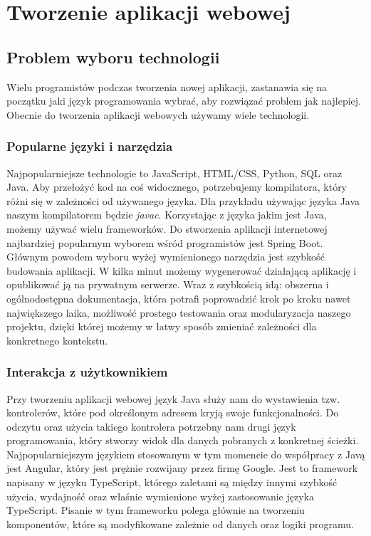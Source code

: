 \chapter{Tworzenie aplikacji webowej}

\section{Problem wyboru technologii}

Wielu programistów podczas tworzenia nowej aplikacji, zastanawia się na początku jaki język programowania wybrać, aby rozwiązać problem jak najlepiej. Obecnie do tworzenia aplikacji webowych używamy wiele technologii.

\subsection{Popularne języki i narzędzia}

Najpopularniejsze technologie to JavaScript, HTML/CSS, Python, SQL oraz Java. Aby przełożyć kod na coś widocznego, potrzebujemy kompilatora, który różni się w zależności od używanego języka. Dla przykładu używając języka Java naszym kompilatorem będzie \textit{javac}. Korzystając z języka jakim jest Java, możemy używać wielu frameworków. Do stworzenia aplikacji internetowej najbardziej popularnym wyborem wśród programistów jest Spring Boot. Głównym powodem wyboru wyżej wymienionego narzędzia jest szybkość budowania aplikacji. W kilka minut możemy wygenerować działającą aplikację i opublikować ją na prywatnym serwerze. Wraz z szybkością idą: obszerna i ogólnodostępna dokumentacja, która potrafi poprowadzić krok po kroku nawet największego laika, możliwość prostego testowania oraz modularyzacja naszego projektu, dzięki której możemy w łatwy sposób zmieniać zależności dla konkretnego kontekstu.

\subsection{Interakcja z użytkownikiem}

Przy tworzeniu aplikacji webowej język Java służy nam  do wystawienia tzw. kontrolerów, które pod określonym adresem kryją swoje funkcjonalności. Do odczytu oraz użycia takiego kontrolera potrzebny nam drugi język programowania, który stworzy widok dla danych pobranych z konkretnej ścieżki. Najpopularniejszym językiem stosowanym w tym momencie do współpracy z Javą jest Angular, który jest prężnie rozwijany przez firmę Google. Jest to framework napisany w języku TypeScript, którego zaletami są między innymi szybkość użycia, wydajność oraz właśnie wymienione wyżej zastosowanie języka TypeScript. Pisanie w tym frameworku polega głównie na tworzeniu komponentów, które są modyfikowane zależnie od danych oraz logiki programu.

